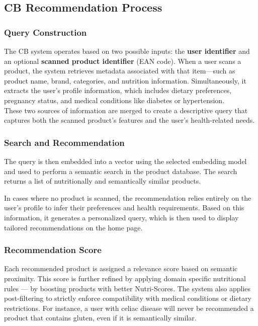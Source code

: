 \subsection{CB Recommendation Process}
\subsubsection{Query Construction}
\par The CB system operates based on two possible inputs: the \textbf{user identifier} and an optional \textbf{scanned product identifier} (EAN code). When a user scans a product, the system retrieves metadata associated with that item—such as product name, brand, categories, and nutrition information. Simultaneously, it extracts the user’s profile information, which includes dietary preferences, pregnancy status, and medical conditions like diabetes or hypertension.\\
These two sources of information are merged to create a descriptive query that captures both the scanned product’s features and the user's health-related needs. 

\subsubsection{Search and Recommendation}
The query is then embedded into a vector using the selected embedding model and used to perform a semantic search in the product database. The search returns a list of nutritionally and semantically similar products.
\par In cases where no product is scanned, the recommendation relies entirely on the user’s profile to infer their preferences and health requirements. Based on this information, it generates a personalized query, which is then used to display tailored recommendations on the home page.


\subsubsection{Recommendation Score}
\par Each recommended product is assigned a relevance score based on semantic proximity. This score is further refined by applying domain specific nutritional rules — by boosting products with better Nutri-Scores. The system also applies post-filtering to strictly enforce compatibility with medical conditions or dietary restrictions. For instance, a user with celiac disease will never be recommended a product that contains gluten, even if it is semantically similar.

